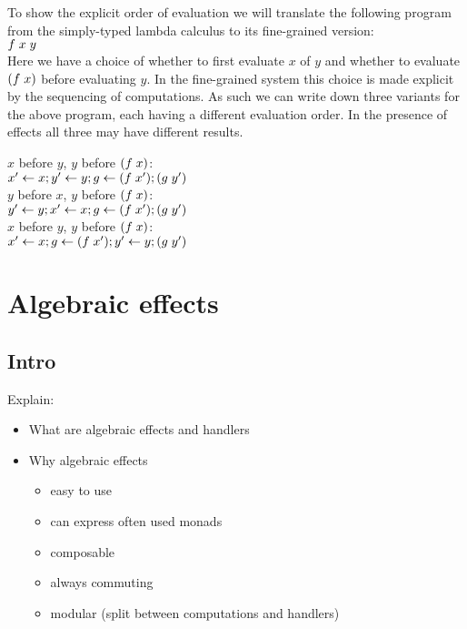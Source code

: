 {%

To show the explicit order of evaluation we will translate the following program from the simply-typed lambda calculus to its fine-grained version:\\
$f \; x \; y$\\
Here we have a choice of whether to first evaluate $x$ of $y$ and whether to evaluate $(f \; x)$ before evaluating $y$.
In the fine-grained system this choice is made explicit by the sequencing of computations.
As such we can write down three variants for the above program, each having a different evaluation order.
In the presence of effects all three may have different results.

$x$ before $y$, $y$ before $(f \; x)$: \\\indent
$x' \leftarrow x ; y' \leftarrow y ; g \leftarrow (f \; x') ; (g \; y') $\\
$y$ before $x$, $y$ before $(f \; x)$:\\\indent
$y' \leftarrow y ; x' \leftarrow x ; g \leftarrow (f \; x') ; (g \; y') $\\
$x$ before $y$, $y$ before $(f \; x)$:\\\indent
$x' \leftarrow x ; g \leftarrow (f \; x') ; y' \leftarrow y ; (g \; y') $\\

\newpage
\section{Algebraic effects}

\subsection{Intro}
Explain:
\begin{itemize}
	\item What are algebraic effects and handlers
	\item Why algebraic effects
	\begin{itemize}
		\item easy to use
		\item can express often used monads
		\item composable
		\item always commuting
		\item modular (split between computations and handlers)
	\end{itemize}
\end{itemize}

}
